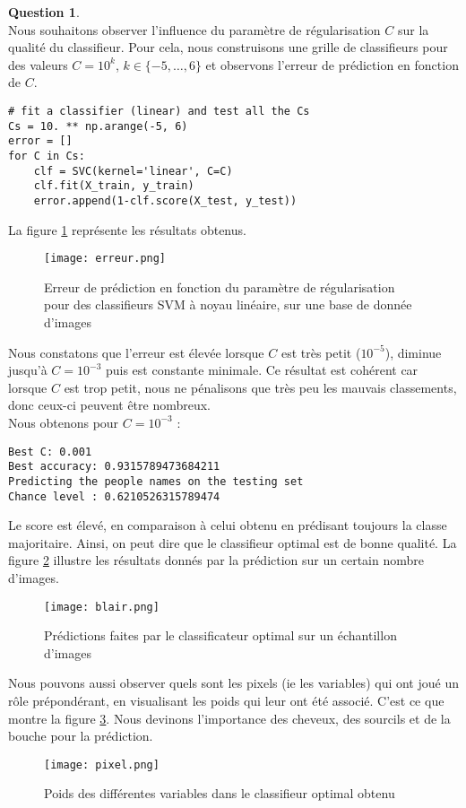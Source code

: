 \documentclass[11pt,a4paper]{article}
\theoremstyle{definition}
\newtheorem{Qu}{Question}
\begin{document}
\begin{Qu}~\\

Nous souhaitons observer l'influence du paramètre de régularisation $C$ sur la qualité du classifieur. Pour cela, nous construisons une grille de classifieurs pour des valeurs $C=10^{k}$, $k\in\{-5,\ldots,6\}$ et observons l'erreur de prédiction en fonction de $C$. 

\begin{verbatim}
# fit a classifier (linear) and test all the Cs
Cs = 10. ** np.arange(-5, 6)
error = []
for C in Cs:
    clf = SVC(kernel='linear', C=C)
    clf.fit(X_train, y_train)
    error.append(1-clf.score(X_test, y_test))
\end{verbatim}

La figure \ref{qu4} représente les résultats obtenus.


 
\begin{figure}[h!]\centering
\texttt{[image: erreur.png]}
\caption{Erreur de prédiction en fonction du paramètre de régularisation pour des classifieurs SVM à noyau linéaire, sur une base de donnée d'images}
\label{qu4}
\end{figure}

Nous constatons que l'erreur est élevée lorsque $C$ est très petit ($10^{-5}$), diminue jusqu'à $C=10^{-3}$ puis est constante minimale.
Ce résultat est cohérent car lorsque $C$ est trop petit, nous ne pénalisons que très peu les mauvais classements, donc ceux-ci peuvent être nombreux. \\
Nous obtenons pour $C=10^{-3}$ :  

\begin{verbatim}
Best C: 0.001
Best accuracy: 0.9315789473684211
Predicting the people names on the testing set
Chance level : 0.6210526315789474
\end{verbatim}


Le score est élevé, en comparaison à celui obtenu en prédisant toujours la classe majoritaire. Ainsi, on peut dire que le classifieur optimal est de bonne qualité. La figure \ref{blair} illustre les résultats donnés par la prédiction sur un certain nombre d'images.

 
\begin{figure}[h!]\centering
\texttt{[image: blair.png]}
\caption{Prédictions faites par le classificateur optimal sur un échantillon d'images}
\label{blair}
\end{figure}

Nous pouvons aussi observer quels sont les pixels (ie les variables) qui ont joué un rôle prépondérant, en visualisant les poids qui leur ont été associé. C'est ce que montre la figure \ref{pixel}. Nous devinons l'importance des cheveux, des sourcils et de la bouche pour la prédiction.

 
\begin{figure}[h!]\centering
\texttt{[image: pixel.png]}
\caption{Poids des différentes variables dans le classifieur optimal obtenu}
\label{pixel}
\end{figure}

\end{Qu}
\end{document}
